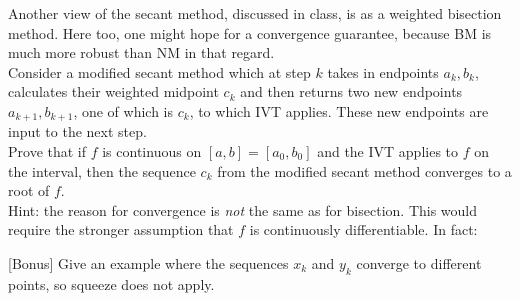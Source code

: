 \documentclass{article}
\begin{document}
\begin{problem}
    Another view of the secant method, discussed in class, is as a weighted bisection method. Here too, one might hope for a convergence guarantee, because BM is much more robust than NM in that regard.\\[-0.5em]

    Consider a modified secant method which at step \(k\) takes in endpoints \(a_k,b_k\), calculates their weighted midpoint \(c_k\) and then returns two new endpoints \(a_{k+1},b_{k+1}\), one of which is \(c_k\), to which IVT applies. These new endpoints are input to the next step.\\[-0.5em]

    Prove that if \(f\) is continuous on \([a,b] = [a_0,b_0]\) and the IVT applies to \(f\) on the interval, then the sequence \(c_k\) from the modified secant method converges to a root of \(f\).\\[-0.5em]

    Hint: the reason for convergence is \emph{not} the same as for bisection. This would require the stronger assumption that \(f\) is continuously differentiable. In fact:

    [Bonus] Give an example where the sequences \(x_k\) and \(y_k\) converge to different points, so squeeze does not apply.
\end{problem}
\end{document}
